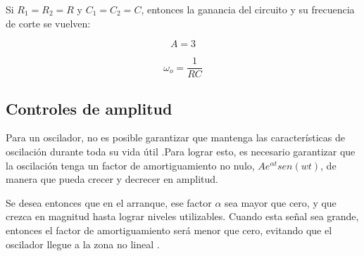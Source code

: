 Si $R_1 = R_2 = R$ y $C_1 = C_2 = C$, entonces la ganancia del circuito y su frecuencia de corte se vuelven:

\begin{equation}
  A = 3
  \label{eq:ganancia-oscilador-wien}
\end{equation}

\begin{equation}
  \omega_o = \frac{1}{RC}
  \label{eq:frecuancia-corte-oscilador-wien}
\end{equation}

\subsection{Controles de amplitud}

Para un oscilador, no es posible garantizar que mantenga las características
de oscilación durante toda su vida útil \cite{herrera-osciladores}.Para lograr esto, es necesario garantizar que la oscilación tenga un factor
de amortiguamiento no nulo, $A e^{\alpha t}sen(wt)$, de manera que pueda crecer y decrecer en amplitud.

Se desea entonces que en el arranque, ese factor $\alpha$ sea mayor que cero, y que crezca en magnitud hasta lograr niveles utilizables. Cuando esta señal sea grande, entonces el factor de amortiguamiento será menor que cero, evitando que el oscilador llegue a la zona no lineal \cite{herrera-osciladores}.